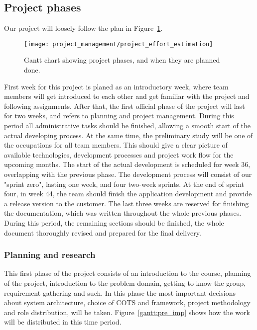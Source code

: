 \subsection{Project phases}
Our project will loosely follow the plan in Figure~\ref{gantt:project}.

\begin{figure}[h]
\centering
  \texttt{[image: project\_management/project\_effort\_estimation]}
  \caption[Gantt chart of project phases]{Gantt chart showing project phases, and when they are planned done.}
  \label{gantt:project}
\end{figure}
First week for this project is planed as an introductory week, where team members will get introduced to each other and get familiar with the project and following assignments.
After that, the first official phase of the project will last for two weeks, and refers to planning and project management. 
During this period all administrative tasks should be finished, allowing a smooth start of the actual developing process. 
At the same time, the preliminary study will be one of the occupations for all team members. 
This should give a clear picture of available technologies, development processes and project work flow for the upcoming months.
The start of the actual development is scheduled for week 36, overlapping with the previous phase. 
The development process will consist of our "sprint zero", lasting one week, and four two-week sprints. 
At the end of sprint four, in week 44, the team should finish the application development and provide a release version to the customer.
The last three weeks are reserved for finishing the documentation, which was written throughout the whole previous phases. 
During this period, the remaining sections should be finished, the whole document thoroughly revised and prepared for the final delivery.

\subsubsection{Planning and research}

This first phase of the project consists of an introduction to the course,
planning of the project, introduction to the problem domain, getting to know
the group, requirement gathering and such. In this phase the most important
decisions about system architecture, choice of COTS and framework, project
methodology and role distribution, will be taken. Figure~\ref{gantt:pre_imp}
shows how the work will be distributed in this time period.

